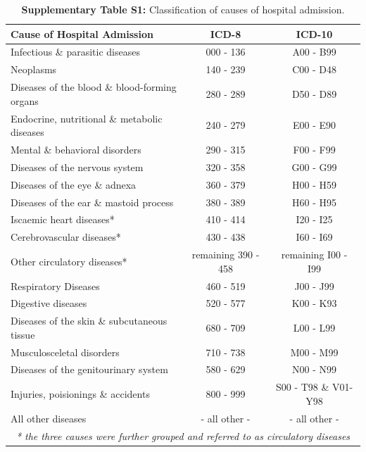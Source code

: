 \begin{landscape}

\begin{table}[htbp]
  \centering
  \caption*{\textbf{Supplementary Table S1:} Classification of causes of hospital admission.}
    \begin{tabular}{lcc}
    \toprule
    \textbf{Cause of Hospital Admission } & \textbf{ICD-8} & \textbf{ICD-10} \\
    \midrule
    Infectious \& parasitic diseases & 000 - 136 & A00 - B99 \\
    Neoplasms & 140 - 239 & C00 - D48 \\
    Diseases of the blood \& blood-forming organs & 280 - 289 & D50 - D89 \\
    Endocrine, nutritional \& metabolic diseases & 240 - 279 & E00 - E90 \\
    Mental \& behavioral disorders & 290 - 315 & F00 - F99 \\
    Diseases of the nervous system & 320 - 358 & G00 - G99 \\
    Diseases of the eye \& adnexa & 360 - 379 & H00 - H59 \\
    Diseases of the ear \& mastoid process & 380 - 389 & H60 - H95 \\
    Iscaemic heart diseases* & 410 - 414 & I20 - I25 \\
    Cerebrovascular diseases* & 430 - 438 & I60 - I69 \\
    Other circulatory diseases* & remaining 390 - 458 & remaining I00 - I99 \\
    Respiratory Diseases & 460 - 519 & J00 - J99 \\
    Digestive diseases & 520 - 577 & K00 - K93 \\
    Diseases of the skin \& subcutaneous tissue & 680 - 709 & L00 - L99 \\
    Musculosceletal disorders & 710 - 738 & M00 - M99 \\
    Diseases of the genitourinary system & 580 - 629 & N00 - N99 \\
    Injuries, poisionings \& accidents & 800 - 999 & S00 - T98 \& V01-Y98 \\
    All other diseases & - all other - & - all other - \\
    \bottomrule
    \bottomrule
	\multicolumn{3}{c}{\textit{* the three causes were further grouped and referred to as circulatory diseases}} \\
    \end{tabular}%
\label{ch2:tabS1}
\end{table}%

\end{landscape}



